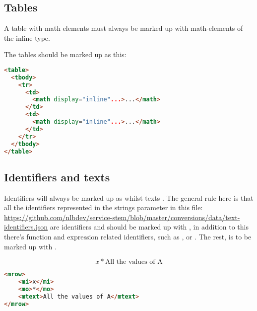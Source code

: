 \documentclass[english,a4paper,11pt]{article}
\begin{document}
\subsection{Tables}

A table with math elements must always be marked up with math-elements of the inline type.

\begin{eksempler}
The tables should be marked up as this:
\begin{lstlisting}[language=HTML]
<table>
  <tbody>
    <tr>
      <td>
        <math display="inline"...>...</math>
      </td>
      <td>
        <math display="inline"...>...</math>
      </td>
    </tr>
  </tbody>
</table>
\end{lstlisting}
\end{eksempler}

\subsection{Identifiers and texts}

Identifiers will always be marked up as  whilst texts . The general rule here is that all the identifiers represented in the strings parameter in this file: \url{https://github.com/nlbdev/service-stem/blob/master/conversions/data/text-identifiers.json} are identifiers and should be marked up with , in addition to this there's function and expression related identifiers, such as ,  or . The rest, is to be marked up with .

\begin{eksempler}
\begin{equation}
	x * \text{All the values of A}
\end{equation}
\begin{lstlisting}[language=HTML]
<mrow>
	<mi>x</mi>
	<mo>*</mo>
	<mtext>All the values of A</mtext>
</mrow>
\end{lstlisting}
\end{eksempler}
\end{document}
